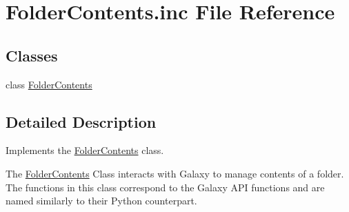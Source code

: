 \hypertarget{FolderContents_8inc}{}\section{Folder\+Contents.\+inc File Reference}
\label{FolderContents_8inc}
\subsection*{Classes}
\begin{DoxyCompactItemize}
\item 
class \hyperlink{classFolderContents}{Folder\+Contents}
\end{DoxyCompactItemize}


\subsection{Detailed Description}
Implements the \hyperlink{classFolderContents}{Folder\+Contents} class.

The \hyperlink{classFolderContents}{Folder\+Contents} Class interacts with Galaxy to manage contents of a folder. The functions in this class correspond to the Galaxy A\+PI functions and are named similarly to their Python counterpart. 